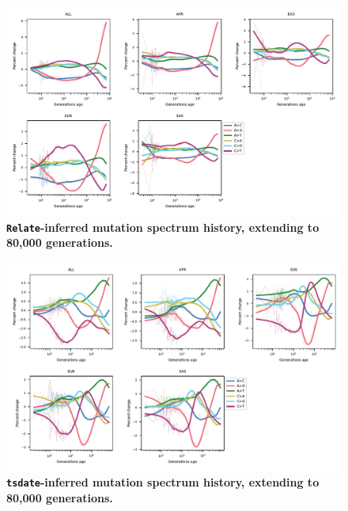 \documentclass[]{article}
\newcommand{\tsdate}{\texttt{tsdate}\xspace}
\newcommand{\relate}{\texttt{Relate}\xspace}
\begin{document}
\begin{figure}[ht!]
    \centering
    \includegraphics[width=\textwidth]{../plots/spectrum_history.relate.max_age.80000.pdf}
    \caption{
        \textbf{\relate-inferred mutation spectrum history, extending to 80,000 generations.}
    }
    \label{fig:geva-spectra-80k}
\end{figure}


\begin{figure}[ht!]
    \centering
    \includegraphics[width=\textwidth]{../plots/spectrum_history.tsdate.max_age.80000.pdf}
    \caption{
        \textbf{\tsdate-inferred mutation spectrum history, extending to 80,000 generations.}
    }
    \label{fig:geva-spectra-80k}
\end{figure}
\end{document}
